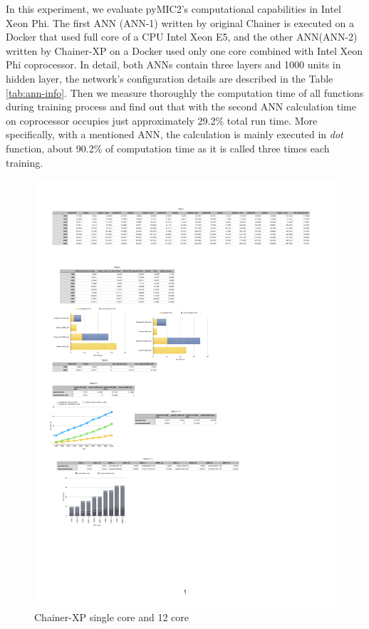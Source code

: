 In this experiment, we evaluate pyMIC2's computational capabilities in Intel Xeon Phi. The first ANN (ANN-1) written by original Chainer is executed on a Docker that used full core of a CPU Intel Xeon E5, and the other ANN(ANN-2) written by Chainer-XP on a Docker used only one core combined with Intel Xeon Phi coprocessor. In detail, both ANNs contain three layers and 1000 units in hidden layer, the network's configuration details are described in the Table \ref{tab:ann-info}. Then we measure thoroughly the computation time of all functions during training process and find out that with the second ANN calculation time on coprocessor occupies just approximately 29.2\% total run time. More specifically, with a mentioned ANN, the calculation is mainly executed in \textit{dot} function, about 90.2\% of computation time as it is called three times each training.
\begin{figure}[]
\centering
\includegraphics[scale=0.5]{img/b.pdf}
\caption{Chainer-XP single core and 12 core}
\label{b.pdf}
\end{figure}

